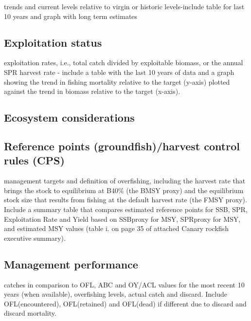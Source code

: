 \documentclass[12pt,]{article}
\begin{document}
trends and current levels relative to virgin or historic levels-include
table for last 10 years and graph with long term estimates

\subsection*{Exploitation status}\label{exploitation-status}

exploitation rates, i.e., total catch divided by exploitable biomass, or
the annual SPR harvest rate - include a table with the last 10 years of
data and a graph showing the trend in fishing mortality relative to the
target (y-axis) plotted against the trend in biomass relative to the
target (x-axis).

\subsection*{Ecosystem considerations}\label{ecosystem-considerations}

\subsection*{Reference points (groundfish)/harvest control rules
(CPS)}\label{reference-points-groundfishharvest-control-rules-cps}

management targets and definition of overfishing, including the harvest
rate that brings the stock to equilibrium at B40\% (the BMSY proxy) and
the equilibrium stock size that results from fishing at the default
harvest rate (the FMSY proxy). Include a summary table that compares
estimated reference points for SSB, SPR, Exploitation Rate and Yield
based on SSBproxy for MSY, SPRproxy for MSY, and estimated MSY values
(table i. on page 35 of attached Canary rockfish executive summary).

\subsection*{Management performance}\label{management-performance}

catches in comparison to OFL, ABC and OY/ACL values for the most recent
10 years (when available), overfishing levels, actual catch and discard.
Include OFL(encountered), OFL(retained) and OFL(dead) if different due
to discard and discard mortality.
\end{document}
